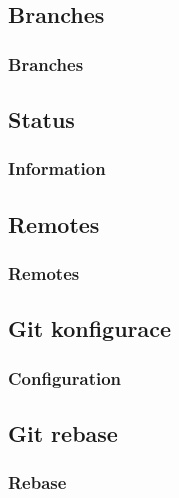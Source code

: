 \subsection{Branches}


\begin{frame}
	\frametitle{Branches}
\end{frame}

\subsection{Status}


\begin{frame}
	\frametitle{Information}
\end{frame}


\subsection{Remotes}


\begin{frame}
	\frametitle{Remotes}
\end{frame}


\subsection{Git konfigurace}

% 

\begin{frame}
	\frametitle{Configuration}
\end{frame}


\subsection{Git rebase}


\begin{frame}
	\frametitle{Rebase}
\end{frame}


